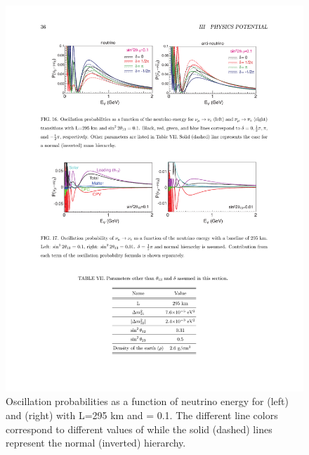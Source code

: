 \begin{figure} [htbp!]
\begin{center}
\includegraphics[width=14cm]{figures/papp_prob.pdf}
\caption{\label{fig:t2kappnub} Oscillation probabilities as a function of neutrino energy for \papp (left) and \pappb (right) with L=295 km and \stot = 0.1. The different line colors correspond to different values of \dcp while the solid (dashed) lines represent the normal (inverted) hierarchy.   }
\end{center}
\end{figure}

%

